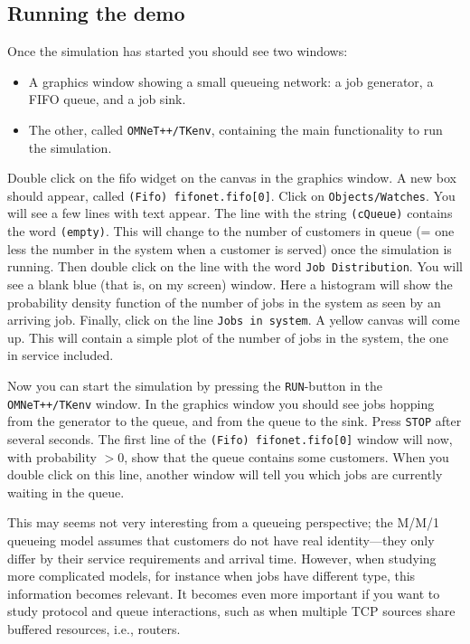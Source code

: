 \documentclass[a4paper]{article}
\begin{document}
\subsection{Running the demo}
\label{sec:running-simulation}
Once the simulation has started you should see two windows:
\begin{itemize}
\item A graphics window showing a small queueing network: a job
  generator, a FIFO queue, and a job sink.
\item The other, called \texttt{OMNeT++/TKenv}, containing the main  functionality to
  run the simulation.
\end{itemize}

Double click on the fifo widget on the canvas in the graphics window.
A new box should appear, called \texttt{(Fifo) fifonet.fifo[0]}. Click
on \texttt{Objects/Watches}.  You will see a few lines with text
appear. The line with the string \texttt{(cQueue)} contains the word
\texttt{(empty)}.  This will change to the number of customers in
queue (= one less the number in the system when a customer is served)
once the simulation is running.  Then double click on the line with
the word \texttt{Job Distribution}.  You will see a blank blue (that
is, on my screen) window. Here a histogram will show the probability
density function of the number of jobs in the system as seen by an
arriving job. Finally, click on the line \texttt{Jobs in system}. A
yellow canvas will come up. This will contain a simple plot of the
number of jobs in the system, the one in service included.

Now you can start the simulation by pressing the \texttt{RUN}-button
in the \texttt{OMNeT++/TKenv} window. In the graphics window you should
see jobs hopping from the generator to the queue, and from the queue
to the sink.  Press \texttt{STOP} after several seconds. The first
line of the \texttt{(Fifo) fifonet.fifo[0]} window will now, with probability
$ > 0$, show that the queue contains some customers. When you double
click on this line, another window will tell you which jobs are currently
waiting in the queue.

This may seems not very interesting from a
queueing perspective; the M/M/1 queueing model assumes that
customers do not have real identity---they only differ by their
service requirements and arrival time. However, when studying more
complicated models, for instance when jobs have different type, this
information becomes relevant. It becomes even more important if you
want to study protocol and queue interactions, such as when multiple
TCP sources share buffered resources, i.e., routers.
\end{document}
